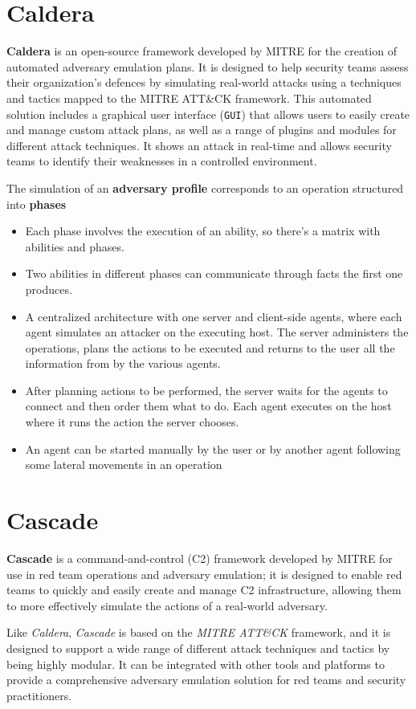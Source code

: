 \section{Caldera}
\textbf{Caldera} is an open-source framework developed by MITRE for the
creation of automated adversary emulation plans.
It is designed to help security teams assess their
organization’s defences by simulating real-world attacks
using a techniques and tactics mapped to the MITRE ATT\&CK framework.
This automated solution includes a graphical user interface
(\texttt{GUI}) that allows users to easily create and manage custom
attack plans, as well as a range of plugins and modules for
different attack techniques.
It shows an attack in real-time
and allows security teams to identify their weaknesses in a
controlled environment.

The simulation of an \textbf{adversary profile} corresponds to an operation
structured into \textbf{phases}
\begin{itemize}
   \item Each phase involves the execution of an ability,
   so there's a matrix with abilities and phases.
   \item Two abilities in different phases can communicate through facts the
   first one produces. 
   \item A centralized architecture with one server and client-side agents,
   where each agent simulates an attacker on the executing host.
   The server
   administers the operations, plans the actions to be executed and
   returns to the user all the information from by the various agents.
   \item After planning actions to be performed, the server waits for the
   agents to connect and then order them what to do. Each agent
   executes on the host where it runs the action the server chooses.
   \item An agent can be started manually by the user or by another agent
   following some lateral movements in an operation
\end{itemize}


\section{Cascade}
\textbf{Cascade} is a command-and-control (C2) framework developed by MITRE for
use in red team operations and adversary emulation;
it is designed to enable red teams to quickly and
easily create and manage C2 infrastructure, allowing them to
more effectively simulate the actions of a real-world adversary.

Like \textit{Caldera}, \textit{Cascade} is based on the \textit{MITRE ATT\&CK}
framework, and it is designed to support a wide range of different attack techniques and tactics by being highly modular.
It can be integrated with other tools and platforms to provide a
comprehensive adversary emulation solution for red teams and security practitioners.